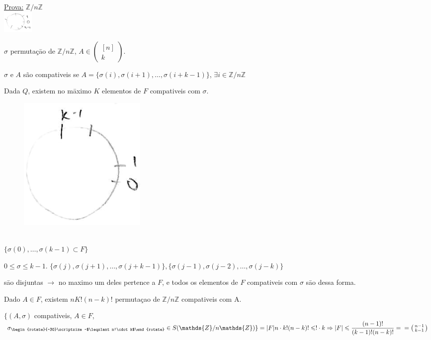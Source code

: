 \documentclass[a4paper,12pt]{article}
\theoremstyle{plain} %
\theoremstyle{definition} %
\theoremstyle{remark} %
\newcommand{\rotsup}[1]{\begin{rotate}{-30}\scriptsize ~#1\end{rotate}}%
\begin{document}
	\begin{framed}
		\underline{Prova:} $\mathds{Z}/n\mathds{Z}$ \hspace{3em} \\
		\includegraphics[width=4em]{1 page 4 1.png}
		
		$\sigma$ permuta\c{c}\=ao de $\mathds{Z}/n\mathds{Z}$, $A\in \left(\begin{smallmatrix}
			[n]\\
			k
		\end{smallmatrix}\right)$.	
		
		$\sigma$ e $A$ s\~ao compativeis se $A=\{\sigma(i),\sigma(i+1),\dotso,\sigma(i+k-1)\}$, $\exists i\in \mathds{Z}/n\mathds{Z}$
		
		Dada $Q$, existem no m\=aximo $K$ elementos de $F$ compativeis com $\sigma$.
		
		\begin{figure}
			\includegraphics[width=5 em]{1 page 4 2.png}
		\end{figure} \, \\
		
		$\{\sigma(0),\dotso,\sigma(k-1)\subset F\}$
		
		$0\leqslant\sigma\leqslant k-1$. $\{\sigma(j),\sigma(j+1),\dotso,\sigma(j+k-1)\},\{\sigma(j-1),\sigma(j-2),\dotso,\sigma(j-k)\}$
		
		\vspace{2em}
		s\=ao disjuntas $\rightarrow$ no maximo um deles pertence a $F$, e todos os elementos de $F$ compativeis com $\sigma$ s\=ao dessa forma.
		
		Dado $A\in F$, existem $nK!(n-k)!$ permuta\c{c}ao de $\mathds{Z}/n\mathds{Z}$ compativeis com A.
		
		$\{(A,\sigma)$ compativeis, $A\in F$, $\sigma_{\rotsup{$\leqslant n!\cdot k$}}\in S(\mathds{Z}/n\mathds{Z})\}=|F|n\cdot k!(n-k)!\leqslant !\cdot k\Rightarrow |F|\leqslant\displaystyle\frac{(n-1)!}{(k-1)!(n-k)!}=\\=\left(\begin{smallmatrix}
			n-1\\
			k-1
		\end{smallmatrix}\right)$ \hspace{2ex} \tiny\textblock
		\vspace{2ex}
	\end{framed}
	
\end{document}
